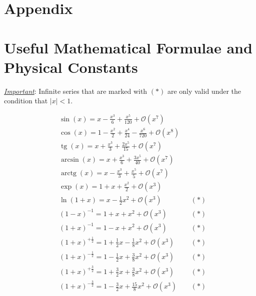 \newpage
\vspace*{-5em}
\enlargethispage{\baselineskip}
\newcommand{\tg}{\operatorname{tg}}
\newcommand{\arctg}{\operatorname{arctg}}
\section*{\centering Appendix}
\section*{\centering Useful Mathematical Formulae and Physical Constants}
\emph{\underline{Important}}: Infinite series that are marked with $(*)$ are only valid under the condition that $|x| < 1$.

\begin{minipage}[t]{0.5\textwidth}
	\vspace{0pt}
	\begin{tcolorbox}[title=\textbf{Taylor Expansions}]
		\vspace{-10pt}
		\begin{align*}
			& \sin(x) = x - \frac{x^3}{6} + \frac{x^5}{120} + \mathcal{O}(x^7)
			&&
			\\[1pt]
			& \cos(x) = 1 - \frac{x^2}{2} + \frac{x^4}{24} - \frac{x^6}{720} + \mathcal{O}(x^8)
			&&
			\\[1pt]
			& \tg(x) = x + \frac{x^3}{3} + \frac{2x^5}{15} + \mathcal{O}(x^7)
			&&
			\\[1pt]
			& \arcsin(x) = x + \frac{x^3}{6} + \frac{3x^5}{40} + \mathcal{O}(x^7)
			&&
			\\[1pt]
			& \arctg(x) = x - \frac{x^3}{3} + \frac{x^5}{5} + \mathcal{O}(x^7)
			&&
			\\[1pt]
			& \exp(x) = 1 + x + \frac{x^2}{2} + \mathcal{O}(x^3)
			&&
			\\[1pt]
			& \ln(1+x) = x - \frac{1}{2}x^2 + \mathcal{O}(x^3)
			&& (*)
			\\[1pt]
			& (1-x)^{-1} = 1 + x + x^2 + \mathcal{O}(x^3)
			&& (*)
			\\[1pt]
			& (1+x)^{-1} = 1 - x + x^2 + \mathcal{O}(x^3)
			&& (*)
			\\[1pt]
			& (1+x)^{+\frac{1}{2}} = 1 + \frac{1}{2}x - \frac{1}{8}x^2 + \mathcal{O}(x^3)
			&& (*)
			\\[1pt]
			& (1+x)^{-\frac{1}{2}} = 1 - \frac{1}{2} x + \frac{3}{8} x^2 + \mathcal{O}(x^3)
			&& (*)
			\\[1pt]
			& (1+x)^{+\frac{3}{2}} = 1 + \frac{3}{2}x + \frac{3}{8}x^2 + \mathcal{O}(x^3)
			&& (*)
			\\[1pt]
			& (1+x)^{-\frac{3}{2}} = 1 - \frac{3}{2}x + \frac{15}{8}x^2 + \mathcal{O}(x^3)
			&& (*)
		\end{align*}
		
	\end{tcolorbox}
\end{minipage}

